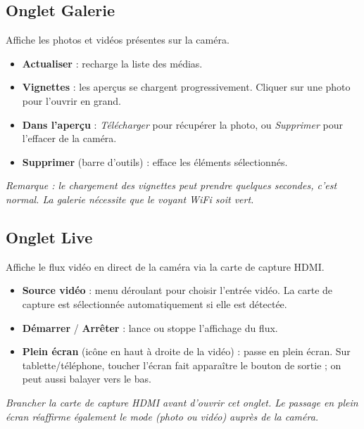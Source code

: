\documentclass[11pt,a4paper]{article}
\begin{document}
\subsection{Onglet Galerie}

Affiche les photos et vidéos présentes sur la caméra.

\begin{itemize}[leftmargin=*]
  \item \textbf{Actualiser} : recharge la liste des médias.
  \item \textbf{Vignettes} : les aperçus se chargent progressivement. Cliquer sur
        une photo pour l'ouvrir en grand.
  \item \textbf{Dans l'aperçu} : \emph{Télécharger} pour récupérer la photo, ou
        \emph{Supprimer} pour l'effacer de la caméra.
  \item \textbf{Supprimer} (barre d'outils) : efface les éléments sélectionnés.
\end{itemize}

\noindent
\textit{Remarque : le chargement des vignettes peut prendre quelques secondes,
c'est normal. La galerie nécessite que le voyant WiFi soit vert.}

\subsection{Onglet Live}

Affiche le flux vidéo en direct de la caméra via la carte de capture HDMI.

\begin{itemize}[leftmargin=*]
  \item \textbf{Source vidéo} : menu déroulant pour choisir l'entrée vidéo. La
        carte de capture est sélectionnée automatiquement si elle est détectée.
  \item \textbf{Démarrer} / \textbf{Arrêter} : lance ou stoppe l'affichage du flux.
  \item \textbf{Plein écran} (icône en haut à droite de la vidéo) : passe en
        plein écran. Sur tablette/téléphone, toucher l'écran fait apparaître le
        bouton de sortie ; on peut aussi balayer vers le bas.
\end{itemize}

\noindent
\textit{Brancher la carte de capture HDMI avant d'ouvrir cet onglet. Le passage
en plein écran réaffirme également le mode (photo ou vidéo) auprès de la caméra.}
\end{document}
